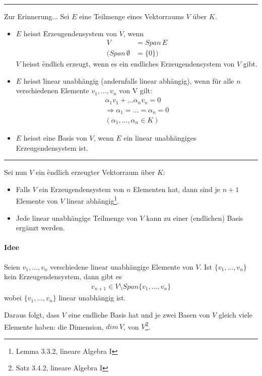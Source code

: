 \vspace*{0.2cm}\rule{\linewidth}{0.3mm}\vspace{0.3cm}
Zur Erinnerung... Sei $E$ eine Teilmenge eines Vektorraums $V$ über $K$.
\begin{itemize}
 \item $E$ heisst \f{Erzeugendensystem} von $V$, wenn 
\begin{align}
V &= Span\, E \\
(Span\, \emptyset &= \{0\})
\end{align}
$V$ heisst \f{endlich erzeugt}, wenn es ein endliches Erzeugendensystem von $V$ gibt.
\item $E$ heisst \f{linear unabhängig} (andernfalls linear abhängig), wenn für alle $n$ verschiedenen Elemente $v_1, ..., v_n$ von V gilt:
\begin{align}
\alpha_1 v_1 + ... \alpha_n v_n = 0  \\
\Rightarrow \alpha_1 = ... = \alpha_n = 0 \\
(\alpha_1, ..., \alpha_n \in K)
\end{align}
\item $E$ heisst eine \f{Basis} von $V$, wenn $E$ ein linear unabhängiges Erzeugendensystem ist.
\end{itemize}
\vspace*{0.2cm}\rule{\linewidth}{0.3mm}\vspace{0.3cm}
Sei nun $V$ ein \f{endlich erzeugter} Vektorraum über $K$:
\begin{itemize}
 \item Falls $V$ ein Erzeugendensystem von $n$ Elementen hat, dann sind je $n+1$ Elemente von $V$ linear abhängig\footnote{Lemma 3.3.2, lineare Algebra I}.
 \item Jede linear unabhängige Teilmenge von $V$ kann zu einer (endlichen) Basis ergänzt werden.
\end{itemize}
\paragraph{Idee} Seien $v_1, ..., v_n$ verschiedene linear unabhängige Elemente von $V$. Ist $\{v_1, ..., v_n\}$ kein Erzeugendensystem, dann gibt es 
\begin{align}
v_{n+1} \in V \setminus Span\{v_1, ..., v_n\}
\end{align}
wobei $\{v_1, ..., v_n\}$ linear unabhängig ist.

Daraus folgt, dass $V$ eine endliche Basis hat und je zwei Basen von $V$ gleich viele Elemente haben: die \f{Dimension}, $dim\, V$, von $V$\footnote{Satz 3.4.2, lineare Algebra I}.

